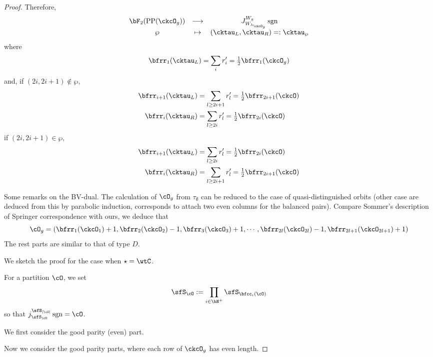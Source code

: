 \documentclass[12pt,a4paper]{amsart}
\def\abs#1{\left|{#1}\right|}
\newcommand{\sgn}{\operatorname{sgn}}
\numberwithin{equation}{section}
\theoremstyle{remark}
\def\half{{\tfrac{1}{2}}}
\def\lamckg{\lambda_{\ckcO_g}}
\def\CPP{\mathrm{PP}}
\begin{document}
\begin{proof}
{      Therefore,
      \[
        \begin{array}{ccc}
          \bF_{2}(\CPP(\ckcO_{g}))&\longrightarrow
          & J_{W_{\lamckg}}^{W_{g}} \sgn \\
          \wp&\mapsto&    (\cktau_{L},\cktau_{R}) =:\cktau_{\wp}
        \end{array}
      \]
      where
      \[
        \bfrr_{1}(\cktau_{L}) = \sum_{i} r'_{i} = \half \bfrr_{1}(\ckcO_{g})
      \]
      and, if $(2i,2i+1)\notin \wp$,
      \[
        \begin{split}
          \bfrr_{i+1}(\cktau_{L}) & = \sum_{l\geq 2i+1} r'_{l}
          = \half\bfrr_{2i+1}(\ckcO)\\
          \bfrr_{i}(\cktau_{R}) & = \sum_{l\geq 2i} r'_{l} = \half\bfrr_{2i}(\ckcO)
        \end{split}
      \]
      if $(2i,2i+1)\in \wp$,
      \[
        \begin{split}
          \bfrr_{i+1}(\cktau_{L}) & = \sum_{l\geq 2i} r'_{l}
          = \half\bfrr_{2i}(\ckcO)\\
          \bfrr_{i}(\cktau_{R}) & = \sum_{l\geq 2i+1} r'_{l} = \half\bfrr_{2i+1}(\ckcO)
        \end{split}
      \]

      Some remarks on the BV-dual. The calculation of $\cO_{g}$ from
      $\tau_{\emptyset}$ can be reduced to the case of quasi-distinguished
      orbits (other case are deduced from this by parabolic induction,
      corresponds to attach two even columns for the balanced pairs). Compare
      Sommer's description of Springer correspondence with ours, we deduce that
      \[
        \cO_{g} = (\bfrr_{1}(\ckcO_{1})+1,\bfrr_{2}(\ckcO_{2})-1,\bfrr_{3}(\ckcO_{3})+1, \cdots, \bfrr_{2l}(\ckcO_{2l})-1,\bfrr_{2l+1}(\ckcO_{2l+1})+1)
      \]
      The rest parts are similar to that of type $D$.
    }


    We sketch the proof for the case when $\star = \wtC$.


    For a partition $\cO$, we set
    \[
      \sfS_{\cO} := \prod_{i\in \bN^{+}}\sfS_{\bfcc_{i}(\cO)}
    \]
    so that $j_{\sfS_{\cO}}^{\sfS_{\abs{\cO}}}\sgn = \cO$.


    We first consider the good parity (even) part.

    Now we consider the good parity parts, where each row of $\ckcO_{g}$ has
    even length.


\end{proof}
\end{document}
